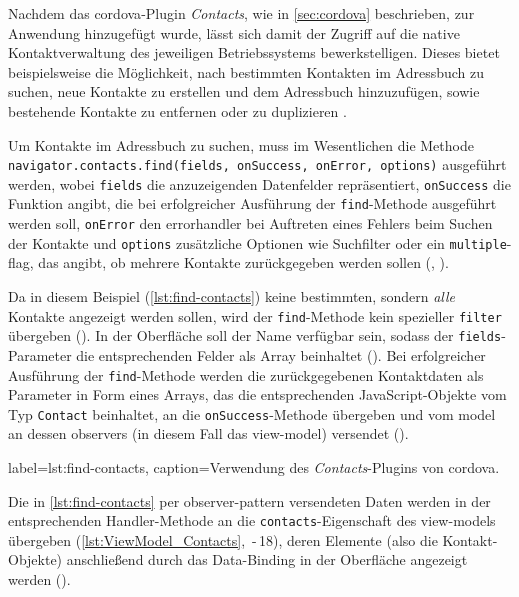 Nachdem das \gls{cordova}-Plugin \emph{Contacts}, wie in \autoref{sec:cordova} beschrieben, zur Anwendung hinzugefügt wurde, lässt sich damit der Zugriff auf die native Kontaktverwaltung des jeweiligen Betriebssystems bewerkstelligen.
Dieses bietet beispielsweise die Möglichkeit, nach bestimmten Kontakten im Adressbuch zu suchen, neue Kontakte zu erstellen und dem Adressbuch hinzuzufügen, sowie bestehende Kontakte zu entfernen oder zu duplizieren \cite{Cordova_Plugin_Registry_Contacts}.

Um Kontakte im Adressbuch zu suchen, muss im Wesentlichen die Methode \lstinline|navigator.contacts.find(fields, onSuccess, onError, options)| ausgeführt werden, wobei \lstinline|fields| die anzuzeigenden Datenfelder repräsentiert, \lstinline|onSuccess| die Funktion angibt, die bei erfolgreicher Ausführung der \lstinline|find|-Methode ausgeführt werden soll, \lstinline|onError| den \gls{errorhandler} bei Auftreten eines Fehlers beim Suchen der Kontakte und \lstinline|options| zusätzliche Optionen wie Suchfilter oder ein \lstinline|multiple|-\gls{flag}, das angibt, ob mehrere Kontakte zurückgegeben werden sollen (, ).

Da in diesem Beispiel (\autoref{lst:find-contacts}) keine bestimmten, sondern \emph{alle} Kontakte angezeigt werden sollen, wird der \lstinline|find|-Methode kein spezieller \lstinline|filter| übergeben (). In der Oberfläche soll der Name verfügbar sein, sodass der \lstinline|fields|-Parameter die entsprechenden Felder als Array beinhaltet (). Bei erfolgreicher Ausführung der \lstinline|find|-Methode werden die zurückgegebenen Kontaktdaten als Parameter in Form eines Arrays, das die entsprechenden JavaScript-Objekte vom Typ \lstinline|Contact| beinhaltet, an die \lstinline|onSuccess|-Methode übergeben und vom \gls{model} an dessen \glspl{observer} (in diesem Fall das \gls{view-model}) versendet ().

	 { label=lst:find-contacts, caption={Verwendung des \emph{Contacts}-Plugins von \gls{cordova}.}}

Die in \autoref{lst:find-contacts} per \gls{observer-pattern} versendeten Daten werden in der entsprechenden Handler-Methode an die \lstinline|contacts|-Eigenschaft des \glspl{view-model} übergeben (\autoref{lst:ViewModel_Contacts}, \,-\,18), deren Elemente (also die Kontakt-Objekte) anschließend durch das Data-Binding in der Oberfläche angezeigt werden (\su).

